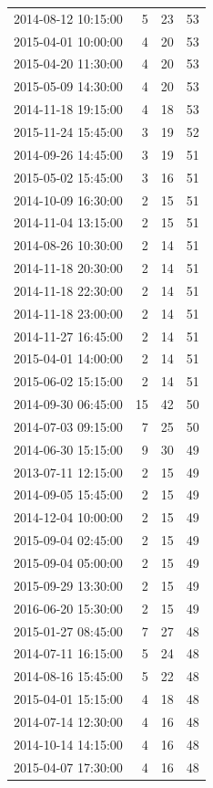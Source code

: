 \begin{tabular}{lrrr}
2014-08-12 10:15:00 & 5 & 23 & 53 \\
2015-04-01 10:00:00 & 4 & 20 & 53 \\
2015-04-20 11:30:00 & 4 & 20 & 53 \\
2015-05-09 14:30:00 & 4 & 20 & 53 \\
2014-11-18 19:15:00 & 4 & 18 & 53 \\
2015-11-24 15:45:00 & 3 & 19 & 52 \\
2014-09-26 14:45:00 & 3 & 19 & 51 \\
2015-05-02 15:45:00 & 3 & 16 & 51 \\
2014-10-09 16:30:00 & 2 & 15 & 51 \\
2014-11-04 13:15:00 & 2 & 15 & 51 \\
2014-08-26 10:30:00 & 2 & 14 & 51 \\
2014-11-18 20:30:00 & 2 & 14 & 51 \\
2014-11-18 22:30:00 & 2 & 14 & 51 \\
2014-11-18 23:00:00 & 2 & 14 & 51 \\
2014-11-27 16:45:00 & 2 & 14 & 51 \\
2015-04-01 14:00:00 & 2 & 14 & 51 \\
2015-06-02 15:15:00 & 2 & 14 & 51 \\
2014-09-30 06:45:00 & 15 & 42 & 50 \\
2014-07-03 09:15:00 & 7 & 25 & 50 \\
2014-06-30 15:15:00 & 9 & 30 & 49 \\
2013-07-11 12:15:00 & 2 & 15 & 49 \\
2014-09-05 15:45:00 & 2 & 15 & 49 \\
2014-12-04 10:00:00 & 2 & 15 & 49 \\
2015-09-04 02:45:00 & 2 & 15 & 49 \\
2015-09-04 05:00:00 & 2 & 15 & 49 \\
2015-09-29 13:30:00 & 2 & 15 & 49 \\
2016-06-20 15:30:00 & 2 & 15 & 49 \\
2015-01-27 08:45:00 & 7 & 27 & 48 \\
2014-07-11 16:15:00 & 5 & 24 & 48 \\
2014-08-16 15:45:00 & 5 & 22 & 48 \\
2015-04-01 15:15:00 & 4 & 18 & 48 \\
2014-07-14 12:30:00 & 4 & 16 & 48 \\
2014-10-14 14:15:00 & 4 & 16 & 48 \\
2015-04-07 17:30:00 & 4 & 16 & 48 \\

\end{tabular}
